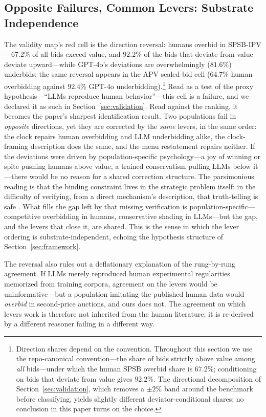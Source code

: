 \subsection{Opposite Failures, Common Levers: Substrate Independence}\label{sec:humans-reversal}

The validity map's red cell is the direction reversal: humans overbid in SPSB-IPV---$67.2\%$ of all bids exceed value, and $92.2\%$ of the bids that deviate from value deviate upward---while GPT-4o's deviations are overwhelmingly ($81.6\%$) underbids; the same reversal appears in the APV sealed-bid cell ($64.7\%$ human overbidding against $92.4\%$ GPT-4o underbidding).\footnote{Direction shares depend on the convention. Throughout this section we use the repo-canonical convention---the share of bids strictly above value among \emph{all} bids---under which the human SPSB overbid share is $67.2\%$; conditioning on bids that deviate from value gives $92.2\%$. The directional decomposition of Section~\ref{sec:validation}, which removes a $\pm2\%$ band around the benchmark before classifying, yields slightly different deviator-conditional shares; no conclusion in this paper turns on the choice.} Read as a test of the proxy hypothesis---``LLMs reproduce human behavior''---this cell is a failure, and we declared it as such in Section~\ref{sec:validation}. Read against the ranking, it becomes the paper's sharpest identification result. Two populations fail in \emph{opposite} directions, yet they are corrected by the \emph{same} levers, in the same order: the clock repairs human overbidding and LLM underbidding alike, the clock-framing description does the same, and the menu restatement repairs neither. If the deviations were driven by population-specific psychology---a joy of winning or spite pushing humans above value, a trained conservatism pulling LLMs below it---there would be no reason for a shared correction structure. The parsimonious reading is that the binding constraint lives in the strategic problem itself: in the difficulty of verifying, from a direct mechanism's description, that truth-telling is safe \citep{li2017obviously, oprea2024decisions}. What fills the gap left by that missing verification is population-specific---competitive overbidding in humans, conservative shading in LLMs---but the gap, and the levers that close it, are shared. This is the sense in which the lever ordering is substrate-independent, echoing the hypothesis structure of Section~\ref{sec:framework}.

The reversal also rules out a deflationary explanation of the rung-by-rung agreement. If LLMs merely reproduced human experimental regularities memorized from training corpora, agreement on the levers would be uninformative---but a population imitating the published human data would \emph{overbid} in second-price auctions, and ours does not. The agreement on which levers work is therefore not inherited from the human literature; it is re-derived by a different reasoner failing in a different way.


